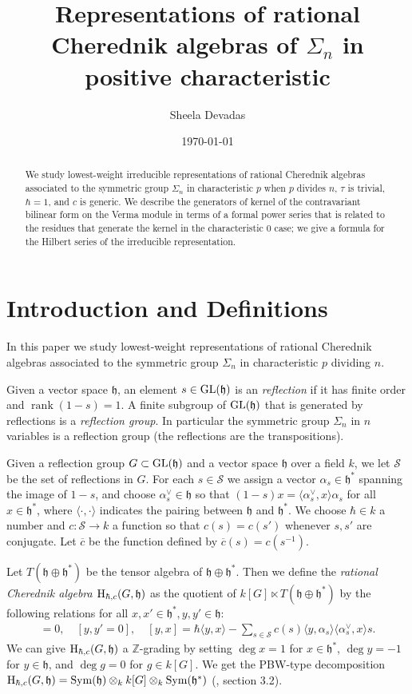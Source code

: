 \documentclass{article}
\title{Representations of rational Cherednik algebras of $\Sigma_n$ in positive characteristic}
\author{Sheela Devadas}
\date{\today}
\numberwithin{equation}{section}
\newcommand{\rank}{\operatorname{rank}}
\newcommand{\h}{\mathfrak{h}}
\newcommand{\GL}{{\rm GL}}
\newcommand{\HH}{{\rm H}}
\newcommand{\Sym}{\operatorname{Sym}}
\begin{document}
\maketitle

\begin{abstract}
We study lowest-weight irreducible representations of rational Cherednik algebras associated to the symmetric group $\Sigma_n$ in characteristic $p$ when $p$ divides $n$, $\tau$ is trivial, $\hbar=1$, and $c$ is generic. We describe the generators of kernel of the contravariant bilinear form on the Verma module in terms of a formal power series that is related to the residues that generate the kernel in the characteristic $0$ case; we give a formula for the Hilbert series of the irreducible representation.
\end{abstract}

\section{Introduction and Definitions}

In this paper we study lowest-weight representations of rational Cherednik algebras associated to the symmetric group $\Sigma_n$ in characteristic $p$ dividing $n$.


Given a vector space $\h$, an element $s \in \GL(\h)$ is an {\it reflection} if it has finite order and $\rank(1-s)=1$. A finite subgroup of $\GL(\h)$ that is generated by reflections is a {\it reflection group}. In particular the symmetric group $\Sigma_n$ in $n$ variables is a reflection group (the reflections are the transpositions). 

Given a reflection group $G \subset \GL(\h)$ and a vector space $\h$ over a field $k$, we let $\mathcal{S}$ be the set of reflections in $G$. For each $s \in \mathcal{S}$ we assign a vector $\alpha_s \in \h^*$ spanning the image of $1-s$, and choose $\alpha_s^\vee \in \h$ so that $(1-s)x=\langle \alpha_s^\vee,x\rangle \alpha_s$ for all $x \in \h^*$, where $\langle \cdot,\cdot\rangle$ indicates the pairing between $\h$ and $\h^*$. We choose $\hbar \in k$ a number and $c: \mathcal{S} \to k$ a function so that $c(s)=c(s')$ whenever $s,s'$ are conjugate. Let $\overline{c}$ be the function defined by $\overline{c}(s)=c(s^{-1})$. 

Let $T(\h \oplus \h^*)$ be the tensor algebra of $\h \oplus \h^*$. Then we define the {\it rational Cherednik algebra $\HH_{\hbar,c}(G,\h)$} as the quotient of $k[G] \ltimes T(\h \oplus \h^*)$ by the following relations for all $x,x' \in \h^*, y,y' \in \h$:
\begin{align*}
[x,x']=0, \quad [y,y' = 0], \quad [y,x] = \hbar\langle y,x\rangle - \sum_{s \in \mathcal{S}} c(s)\langle y,\alpha_s\rangle\langle \alpha_s^\vee,x\rangle s.
\end{align*}
We can give $\HH_{\hbar,c}(G,\h)$ a $\mathbb{Z}$-grading by setting $\deg x=1$ for $x \in \h^*$, $\deg y = -1$ for $y \in \h$, and $\deg g=0$ for $g \in k[G]$. We get the PBW-type decomposition $\HH_{\hbar,c}(G,\h)=\Sym(\h) \otimes_k k[G] \otimes_k \Sym(\h^*)$ (\cite{EM}, section 3.2). 
\end{document}

